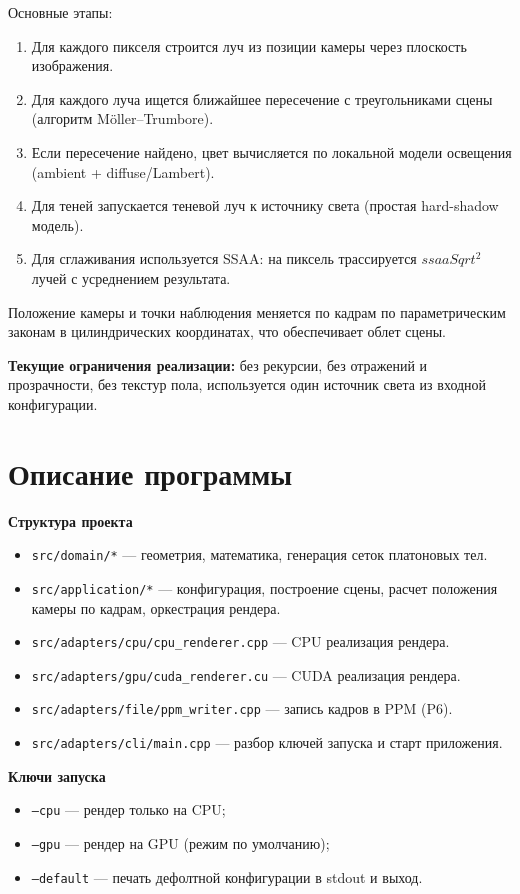 \documentclass[a4paper,14pt]{extarticle}
\begin{document}
Основные этапы:
\begin{enumerate}
    \item Для каждого пикселя строится луч из позиции камеры через плоскость
    изображения.
    \item Для каждого луча ищется ближайшее пересечение с треугольниками сцены
    (алгоритм Möller--Trumbore).
    \item Если пересечение найдено, цвет вычисляется по локальной модели
    освещения (ambient + diffuse/Lambert).
    \item Для теней запускается теневой луч к источнику света
    (простая hard-shadow модель).
    \item Для сглаживания используется SSAA: на пиксель трассируется
    \(ssaaSqrt^2\) лучей с усреднением результата.
\end{enumerate}

Положение камеры и точки наблюдения меняется по кадрам по параметрическим
законам в цилиндрических координатах, что обеспечивает облет сцены.

\textbf{Текущие ограничения реализации:}
без рекурсии, без отражений и прозрачности, без текстур пола,
используется один источник света из входной конфигурации.

\section*{Описание программы}
\textbf{Структура проекта}
\begin{itemize}
    \item \texttt{src/domain/*} --- геометрия, математика, генерация сеток
    платоновых тел.
    \item \texttt{src/application/*} --- конфигурация, построение сцены,
    расчет положения камеры по кадрам, оркестрация рендера.
    \item \texttt{src/adapters/cpu/cpu\_renderer.cpp} --- CPU реализация рендера.
    \item \texttt{src/adapters/gpu/cuda\_renderer.cu} --- CUDA реализация рендера.
    \item \texttt{src/adapters/file/ppm\_writer.cpp} --- запись кадров в PPM (P6).
    \item \texttt{src/adapters/cli/main.cpp} --- разбор ключей запуска и старт приложения.
\end{itemize}

\textbf{Ключи запуска}
\begin{itemize}
    \item \texttt{--cpu} --- рендер только на CPU;
    \item \texttt{--gpu} --- рендер на GPU (режим по умолчанию);
    \item \texttt{--default} --- печать дефолтной конфигурации в stdout и выход.
\end{itemize}
\end{document}
